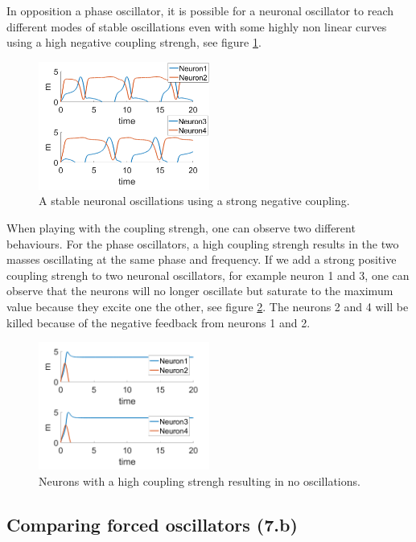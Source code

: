 \documentclass[a4paper]{scrartcl}
\begin{document}
In opposition a phase oscillator, it is possible for a neuronal oscillator to reach different modes of stable oscillations even with some highly non linear curves using a high negative coupling strengh, see figure \ref{crazy}.

\begin{figure}[!h]
	\centering
	\includegraphics[width=0.5\textwidth]{fig/crazy.png}
	\caption{A stable neuronal oscillations using a strong negative coupling.}\label{crazy}
\end{figure}


When playing with the coupling strengh, one can observe two different behaviours. For the phase oscillators, a high coupling strengh results in the two masses oscillating at the same phase and frequency. If we add a strong positive coupling strengh to two neuronal oscillators, for example neuron 1 and 3, one can observe that the neurons will no longer oscillate but saturate to the maximum value because they excite one the other, see figure \ref{kill}. The neurons 2 and 4 will be killed because of the negative feedback from neurons 1 and 2.

\begin{figure}[!h]
	\centering
	\includegraphics[width=0.5\textwidth]{fig/kill.png}
	\caption{Neurons with a high coupling strengh resulting in no oscillations.}\label{kill}
\end{figure}

\newpage

\subsection{Comparing forced oscillators (7.b)}
\end{document}

